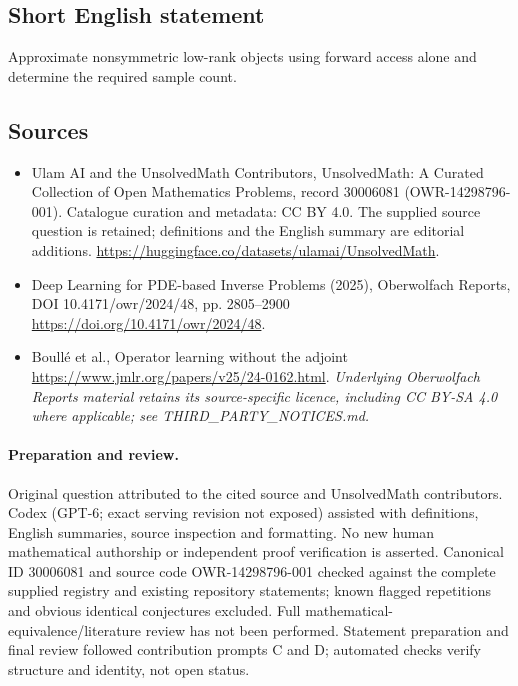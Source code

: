 \documentclass[11pt]{article}
\begin{document}
\subsection{Short English statement}
Approximate nonsymmetric low-rank objects using forward access alone and determine the required sample count.
\subsection{Sources}
\begin{itemize}
\item[\hypertarget{source:30006081:1}{S1}] Ulam AI and the UnsolvedMath Contributors, UnsolvedMath: A Curated Collection of Open Mathematics Problems, record 30006081 (OWR-14298796-001). Catalogue curation and metadata: CC BY 4.0. The supplied source question is retained; definitions and the English summary are editorial additions.
\url{https://huggingface.co/datasets/ulamai/UnsolvedMath}.
\item[\hypertarget{source:30006081:2}{S2}] Deep Learning for PDE-based Inverse Problems (2025), Oberwolfach Reports, DOI 10.4171/owr/2024/48, pp. 2805--2900
\url{https://doi.org/10.4171/owr/2024/48}.
\item[\hypertarget{source:30006081:3}{S3}] Boullé et al., Operator learning without the adjoint
\url{https://www.jmlr.org/papers/v25/24-0162.html}.
\textit{Underlying Oberwolfach Reports material retains its source-specific licence, including CC BY-SA 4.0 where applicable; see THIRD\_PARTY\_NOTICES.md.}
\end{itemize}
\paragraph{Preparation and review.}
Original question attributed to the cited source and UnsolvedMath contributors. Codex (GPT-6; exact serving revision not exposed) assisted with definitions, English summaries, source inspection and formatting. No new human mathematical authorship or independent proof verification is asserted. Canonical ID 30006081 and source code OWR-14298796-001 checked against the complete supplied registry and existing repository statements; known flagged repetitions and obvious identical conjectures excluded. Full mathematical-equivalence/literature review has not been performed. Statement preparation and final review followed contribution prompts C and D; automated checks verify structure and identity, not open status.
\label{end:30006081}
\end{document}

